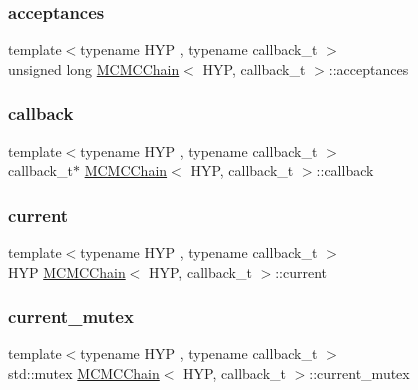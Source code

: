 \subsubsection{\texorpdfstring{acceptances}{acceptances}}
{\footnotesize\ttfamily template$<$typename H\+YP , typename callback\+\_\+t $>$ \\
unsigned long \hyperlink{class_m_c_m_c_chain}{M\+C\+M\+C\+Chain}$<$ H\+YP, callback\+\_\+t $>$\+::acceptances}

\mbox{\label{class_m_c_m_c_chain_aa7a4a0d46ae2d9818c2f076f839badd7}} 
\subsubsection{\texorpdfstring{callback}{callback}}
{\footnotesize\ttfamily template$<$typename H\+YP , typename callback\+\_\+t $>$ \\
callback\+\_\+t$\ast$ \hyperlink{class_m_c_m_c_chain}{M\+C\+M\+C\+Chain}$<$ H\+YP, callback\+\_\+t $>$\+::callback}

\mbox{\label{class_m_c_m_c_chain_ab0c3b31e96d1f703bb8cf55c0575b4bd}} 
\subsubsection{\texorpdfstring{current}{current}}
{\footnotesize\ttfamily template$<$typename H\+YP , typename callback\+\_\+t $>$ \\
H\+YP \hyperlink{class_m_c_m_c_chain}{M\+C\+M\+C\+Chain}$<$ H\+YP, callback\+\_\+t $>$\+::current}

\mbox{\label{class_m_c_m_c_chain_a42c355121fce0476426a49d5498c38a1}} 
\subsubsection{\texorpdfstring{current\+\_\+mutex}{current\_mutex}}
{\footnotesize\ttfamily template$<$typename H\+YP , typename callback\+\_\+t $>$ \\
std\+::mutex \hyperlink{class_m_c_m_c_chain}{M\+C\+M\+C\+Chain}$<$ H\+YP, callback\+\_\+t $>$\+::current\+\_\+mutex\hspace{0.3cm}{\ttfamily [mutable]}}

